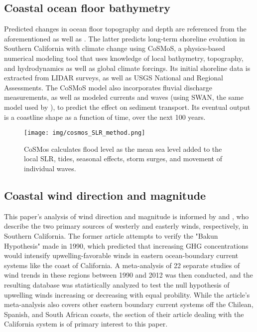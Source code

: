 \documentclass[12pt, letterpaper]{article}
\begin{document}
	\subsection{Coastal ocean floor bathymetry}
	Predicted changes in ocean floor topography and depth are referenced from the aforementioned \citet{swells-deep-water-waves} as well as \citet{bath-cosmos}. The latter predicts long-term shoreline evolution in Southern California with climate change using CoSMoS, a physics-based numerical modeling tool that uses knowledge of local bathymetry, topography, and hydrodynamics as well as global climate forcings. Its initial shoreline data is extracted from LIDAR surveys, as well as USGS National and Regional Assessments. The CoSMoS model also incorporates fluvial discharge measurements, as well as modeled currents and waves (using SWAN, the same model used by \citet{swells-deep-water-waves}), to predict the effect on sediment transport. Its eventual output is a coastline shape as a function of time, over the next 100 years. 

	\begin{figure}[h]
		\centering
		\texttt{[image: img/cosmos\_SLR\_method.png]}
		\caption{CoSMos calculates flood level as the mean sea level added to the local SLR, tides, seasonal effects, storm surges, and movement of individual waves. \citep{bath-cosmos}}
	\end{figure} 

	\subsection {Coastal wind direction and magnitude}
	This paper's analysis of wind direction and magnitude is informed by \citet{winds-coastal} and \citet{winds-santa-ana}, who describe the two primary sources of westerly and easterly winds, respectively, in Southern California. The former article attempts to verify the "Bakun Hypothesis" made in 1990, which predicted that increasing GHG concentrations would intensify upwelling-favorable winds in eastern ocean-boundary current systems like the coast of California. A meta-analysis of 22 separate studies of wind trends in these regions between 1990 and 2012 was then conducted, and the resulting database was statistically analyzed to test the null hypothesis of upwelling winds increasing or decreasing with equal probility. While the article's meta-analysis also covers other eastern boundary current systems off the Chilean, Spanish, and South African coasts, the section of their article dealing with the California system is of primary interest to this paper. \citep{winds-coastal}
\end{document}
